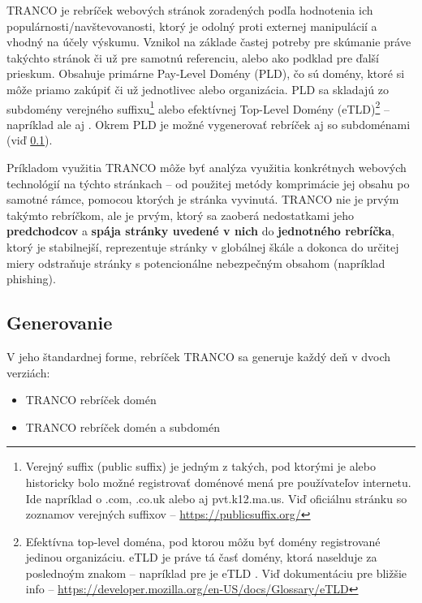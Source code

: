 TRANCO je rebríček webových stránok zoradených podľa hodnotenia ich populárnosti/navštevovanosti, ktorý je odolný proti externej manipulácií a vhodný na účely výskumu. \cite{tranco-homepage} 
Vznikol na základe častej potreby pre skúmanie práve takýchto stránok či už pre samotnú referenciu, alebo ako podklad pre ďalší prieskum.
Obsahuje primárne Pay-Level Domény (PLD), čo sú domény, ktoré si môže priamo zakúpiť či už jednotlivec alebo organizácia. PLD sa skladajú zo subdomény verejného 
suffixu\footnote{Verejný suffix (public suffix) je jedným z takých, pod ktorými je alebo historicky bolo možné registrovať doménové mená pre používateľov internetu. Ide napríklad o .com, .co.uk 
alebo aj pvt.k12.ma.us. Viď oficiálnu stránku so zoznamov verejných suffixov -- \href{https://publicsuffix.org/}{https://publicsuffix.org/}} 
alebo efektívnej Top-Level Domény (eTLD)\footnote{Efektívna top-level doména, pod ktorou môžu byť domény registrované jedinou organizáciu. eTLD je práve tá časť domény, ktorá naselduje za poslednoým 
znakom  -- napríklad pre  je eTLD . Viď dokumentáciu pre bližšie info -- \href{https://developer.mozilla.org/en-US/docs/Glossary/eTLD}
{https://developer.mozilla.org/en-US/docs/Glossary/eTLD}} -- napríklad  ale aj . \cite{tranco} Okrem PLD je možné vygenerovať rebríček aj so subdoménami (viď 
\ref{tranco-generation}).

Príkladom využitia TRANCO môže byť analýza využitia konkrétnych webových technológií na týchto stránkach -- od použitej metódy komprimácie jej obsahu po samotné rámce, pomocou ktorých je 
stránka vyvinutá. 
TRANCO nie je prvým takýmto rebríčkom, ale je prvým, ktorý sa zaoberá nedostatkami jeho \textbf{predchodcov} a \textbf{spája stránky uvedené v nich} do \textbf{jednotného rebríčka}, 
ktorý je stabilnejší, reprezentuje stránky v globálnej škále a dokonca do určitej miery odstraňuje stránky s potencionálne nebezpečným obsahom (napríklad phishing). \cite{tranco} 

\subsection{Generovanie}
\label{tranco-generation}

V jeho štandardnej forme, rebríček TRANCO sa generuje každý deň v dvoch verziách:
\begin{itemize}
    \item TRANCO rebríček domén
    \item TRANCO rebríček domén a subdomén
\end{itemize}

